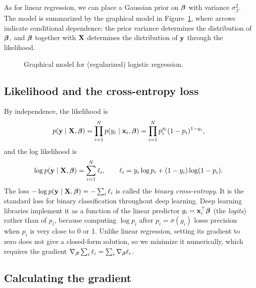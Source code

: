 As for linear regression, we can place a Gaussian prior on $\boldsymbol{\beta}$ with variance $\sigma_\beta^2$. The model is summarized by the graphical model in Figure~\ref{fig:graphical_model}, where arrows indicate conditional dependence: the prior variance determines the distribution of $\boldsymbol{\beta}$, and $\boldsymbol{\beta}$ together with $\mathbf{X}$ determines the distribution of $\mathbf{y}$ through the likelihood.

\begin{figure}[t]
  \centering
  \caption{Graphical model for (regularized) logistic regression.}
  \label{fig:graphical_model}
\end{figure}

\subsection{Likelihood and the cross-entropy loss}

By independence, the likelihood is
\begin{equation}
  p(\mathbf{y}\mid\mathbf{X},\boldsymbol{\beta}) = \prod_{i=1}^N p(y_i\mid\mathbf{x}_i,\boldsymbol{\beta}) = \prod_{i=1}^N p_i^{y_i}(1-p_i)^{1-y_i},
\end{equation}
and the log likelihood is
\begin{equation}
  \log p(\mathbf{y}\mid\mathbf{X},\boldsymbol{\beta}) = \sum_{i=1}^N \ell_i, \qquad \ell_i = y_i\log p_i + (1-y_i)\log(1-p_i).
\end{equation}
The loss $-\log p(\mathbf{y}\mid\mathbf{X},\boldsymbol{\beta})=-\sum_i\ell_i$ is called the \emph{binary cross-entropy}. It is the standard loss for binary classification throughout deep learning. Deep learning libraries implement it as a function of the linear predictor $g_i=\mathbf{x}_i^\top\boldsymbol{\beta}$ (the \emph{logits}) rather than of $p_i$, because computing $\log p_i$ after $p_i=\sigma(g_i)$ loses precision when $p_i$ is very close to 0 or 1. Unlike linear regression, setting its gradient to zero does not give a closed-form solution, so we minimize it numerically, which requires the gradient $\nabla_{\boldsymbol{\beta}}\sum_i\ell_i=\sum_i\nabla_{\boldsymbol{\beta}}\ell_i$.

\subsection{Calculating the gradient}

